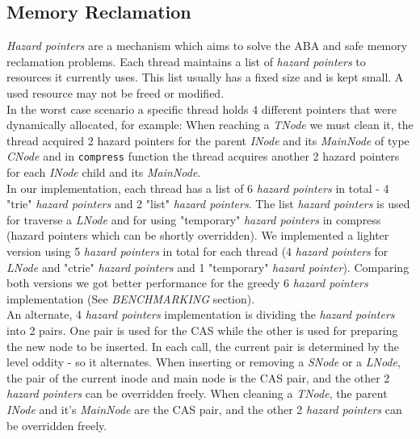\documentclass[conference]{IEEEtran}
\begin{document}
\subsection{Memory Reclamation}
	\textit{Hazard pointers} are a mechanism which aims to solve the ABA and safe memory reclamation problems\cite{hazard}\cite{wiki-hazard}. Each thread maintains a list of \textit{hazard pointers} to resources it currently uses. This list usually has a fixed size and is kept small. A used resource may not be freed or modified.\\
	In the worst case scenario a specific thread holds 4 different pointers that were dynamically allocated, for example:
	When reaching a \textit{TNode} we must clean it, the thread acquired 2 hazard pointers for the parent \textit{INode} and its \textit{MainNode} of type \textit{CNode} and in \texttt{compress} function the thread acquires another 2 hazard pointers for each \textit{INode} child and its \textit{MainNode}. \\
	In our implementation, each thread has a list of 6 \textit{hazard pointers} in total - 4 "trie" \textit{hazard pointers} and 2 "list" \textit{hazard pointers}. The list \textit{hazard pointers} is used for traverse a \textit{LNode} and for using "temporary" \textit{hazard pointers} in compress (hazard pointers which can be shortly overridden). We implemented a lighter version using 5 \textit{hazard pointers} in total\cite{5-hp-cictrie} for each thread (4 \textit{hazard pointers} for \textit{LNode} and "ctrie" \textit{hazard pointers} and 1 "temporary" \textit{hazard pointer}). Comparing both versions we got better performance for the greedy 6 \textit{hazard pointers} implementation (See \textit{BENCHMARKING} section). \\
	An alternate, 4 \textit{hazard pointers} implementation is dividing the \textit{hazard pointers} into 2 pairs. One pair is used for the CAS while the other is used for preparing the new node to be inserted. In each call, the current pair is determined by the level oddity - so it alternates. When inserting or removing a \textit{SNode} or a \textit{LNode}, the pair of the current inode and main node is the CAS pair, and the other 2 \textit{hazard pointers} can be overridden freely. When cleaning a \textit{TNode}, the parent \textit{INode} and it's \textit{MainNode} are the CAS pair, and the other 2 \textit{hazard pointers} can be overridden freely. \\\\
\end{document}
